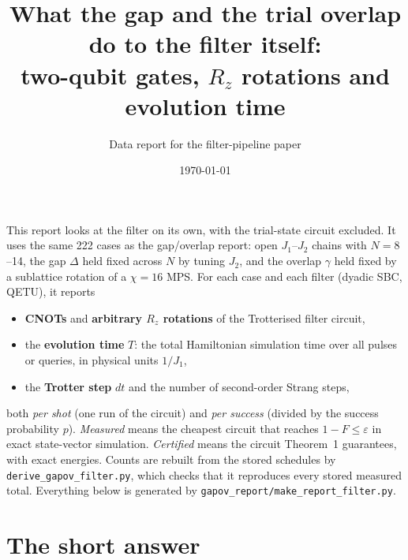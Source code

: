 \documentclass[10pt]{article}
\title{What the gap and the trial overlap do to the filter itself:\\ two-qubit gates, $R_z$ rotations and evolution time}
\author{Data report for the filter-pipeline paper}
\date{\today}
\begin{document}
\maketitle

\noindent This report looks at the filter on its own, with the trial-state circuit excluded. It uses the same
222 cases as the gap/overlap report: open $J_1$--$J_2$ chains with $N=8$--14, the gap $\Delta$ held fixed
across $N$ by tuning $J_2$, and the overlap $\gamma$ held fixed by a sublattice rotation of a $\chi=16$ MPS.
For each case and each filter (dyadic SBC, QETU), it reports
\begin{itemize}
\item \textbf{CNOTs} and \textbf{arbitrary $R_z$ rotations} of the Trotterised filter circuit,
\item the \textbf{evolution time} $T$: the total Hamiltonian simulation time over all pulses or queries, in physical
units $1/J_1$,
\item the \textbf{Trotter step} $dt$ and the number of second-order Strang steps,
\end{itemize}
both \emph{per shot} (one run of the circuit) and \emph{per success} (divided by the success probability $p$).
\emph{Measured} means the cheapest circuit that reaches $1-F\le\varepsilon$ in exact state-vector simulation.
\emph{Certified} means the circuit Theorem~1 guarantees, with exact energies. Counts are rebuilt from the stored
schedules by \texttt{derive\_gapov\_filter.py}, which checks that it reproduces every stored measured total.
Everything below is generated by \texttt{gapov\_report/make\_report\_filter.py}.

\section{The short answer}
\end{document}
